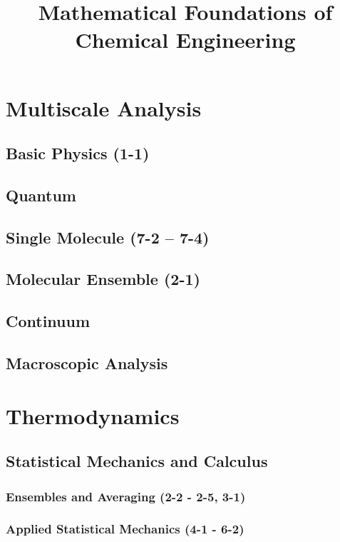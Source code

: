 \documentclass{mitqualif}
\title{Mathematical Foundations of Chemical Engineering}
\begin{document}
\mytitlepage %
\newpage

\tableofcontents
\newpage

%
\chapter{Multiscale Analysis}
\section{Basic Physics (1-1)}

\section{Quantum}
\section{Single Molecule (7-2 -- 7-4)}



\section{Molecular Ensemble (2-1)}

\section{Continuum}
\section{Macroscopic Analysis}
\clearpage
\chapter{Thermodynamics}
\section{Statistical Mechanics and Calculus}
\subsection{Ensembles and Averaging (2-2 - 2-5, 3-1)}





\clearpage
\subsection{Applied Statistical Mechanics (4-1 - 6-2)}
\end{document}
